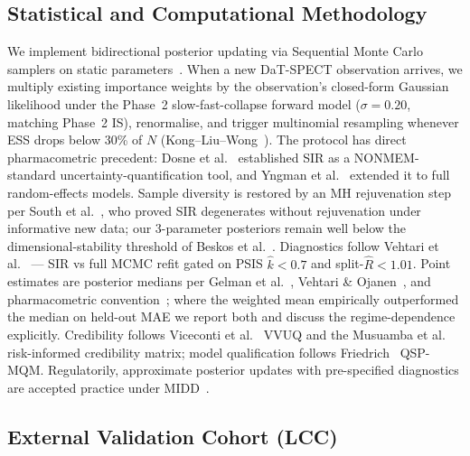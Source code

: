 \subsection{Statistical and Computational Methodology}

We implement bidirectional posterior updating via Sequential Monte Carlo samplers on static parameters~\cite{chopin2002sequential,delmoral2006smc,chopin2020introduction}. When a new DaT-SPECT observation arrives, we multiply existing importance weights by the observation's closed-form Gaussian likelihood under the Phase~2 slow-fast-collapse forward model ($\sigma = 0.20$, matching Phase~2 IS), renormalise, and trigger multinomial resampling whenever ESS drops below 30\% of $N$ (Kong--Liu--Wong~\cite{kong1994sequential}). The protocol has direct pharmacometric precedent: Dosne et al.~\cite{dosne2016sir,dosne2017automated} established SIR as a NONMEM-standard uncertainty-quantification tool, and Yngman et al.~\cite{yngman2022fullrandom} extended it to full random-effects models. Sample diversity is restored by an MH rejuvenation step per South et al.~\cite{south2019smc}, who proved SIR degenerates without rejuvenation under informative new data; our 3-parameter posteriors remain well below the dimensional-stability threshold of Beskos et al.~\cite{beskos2014stability}. Diagnostics follow Vehtari et al.~\cite{vehtari2017practical,vehtari2024psis,vehtari2021rhat} --- SIR vs full MCMC refit gated on PSIS $\hat{k} < 0.7$ and split-$\hat{R} < 1.01$. Point estimates are posterior medians per Gelman et al.~\cite{gelman2013bda3}, Vehtari \& Ojanen~\cite{vehtari2012survey}, and pharmacometric convention~\cite{mould2013basic2,mould2014basic3}; where the weighted mean empirically outperformed the median on held-out MAE we report both and discuss the regime-dependence explicitly. Credibility follows Viceconti et al.~\cite{viceconti2021insilico,viceconti2025credibilityml} VVUQ and the Musuamba et al.~\cite{musuamba2021credibility} risk-informed credibility matrix; model qualification follows Friedrich~\cite{friedrich2016mqm} QSP-MQM. Regulatorily, approximate posterior updates with pre-specified diagnostics are accepted practice under MIDD~\cite{marshall2016goodpractices,marshall2019midd,marshall2023harmonized,ich_m15_2024,galluppi2024midd}.

\subsection{External Validation Cohort (LCC)}

